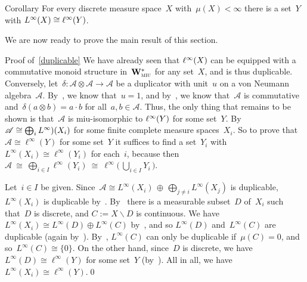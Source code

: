 \documentclass[a]{subfiles}
\begin{document}
\begin{parsec}
\begin{point}{Corollary}%
For every discrete 
measure space~$X$ with~$\mu(X)<\infty$
there is a  set~$Y$ with $L^\infty(X)\cong \ell^\infty(Y)$.
\end{point}
\end{parsec}
\begin{parsec}%
\begin{point}%
We are now ready to prove
the main result of this section.
\end{point}
\begin{point}{Proof of~\ref{duplicable}}%
We have already seen that $\ell^\infty(X)$
can be  equipped with a commutative monoid
structure in~$\mathbf{W}^*_{\text{\textsc{miu}}}$
for any set~$X$,
and is thus duplicable.
Conversely,
let~$\delta\colon \mathscr{A}\otimes\mathscr{A}\to\mathscr{A}$
be a duplicator with unit~$u$ on a von Neumann algebra~$\mathscr{A}$.
By~, we know that~$u=1$,
and by~,
we know that~$\mathscr{A}$
is commutative 
and~$\delta(a\otimes b)=a\cdot b$
for all~$a,b\in \mathscr{A}$.
Thus, the only thing that remains to be shown
is that~$\mathscr{A}$ is miu-isomorphic to $\ell^\infty(Y)$
for some set~$Y$.
By~
$\mathscr{A}\cong \bigoplus_i L^\infty)(X_i)$
for some finite complete measure spaces~$X_i$.
So to prove that~$\mathscr{A}\cong \ell^\infty(Y)$
for some set~$Y$ it 
suffices
to find
 a set~$Y_i$
with $L^\infty(X_i)\cong \ell^\infty(Y_i)$
for each~$i$,
because then 
$\textstyle \mathscr{A}\ \cong \ 
\bigoplus_{i\in I} \ell^\infty(Y_i)\ \cong\ 
\ell^\infty\bigl(\,\bigcup_{i\in I} Y_i\,\bigr)$.

Let~$i\in I$ be given.
Since~$\mathscr{A}\cong L^\infty(X_i)\,\oplus\,\bigoplus_{j\neq i} 
L^\infty(X_j)$ is duplicable,
$L^\infty(X_i)$ is duplicable
by~.
By~
there is a measurable subset~$D$ of~$X_i$ such that~$D$
is discrete, and $C:=X\backslash D$ is continuous.
We have~$L^\infty(X_i)\cong L^\infty(D)\oplus L^\infty(C)$
by~\sref{lem:measure-space-partition},
and
so $L^\infty(D)$ and~$L^\infty(C)$
are duplicable
(again by~).
By~,
$L^\infty(C)$
can only be duplicable if~$\mu(C)=0$,
and so~$L^\infty(C)\cong \{0\}$.
On the other hand,
since~$D$ is discrete,
we have~$L^\infty(D)\cong \ell^\infty(Y)$
for some set~$Y$
(by~).
All in all, we have $L^\infty(X_i)\cong \ell^\infty(Y)$.\qed
\end{point}
\end{parsec}
\end{document}
